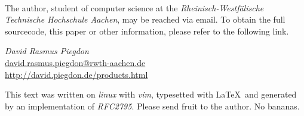 \documentclass[twoside,a4paper,graphics,11pt,dvips]{article}
\begin{document}
\begin{small}

%
\ 


The author, student of computer science at the \emph{Rheinisch-Westf\"alische
Technische Hochschule Aachen}, may be reached via email. To obtain the full
sourcecode, this paper or other information, please refer to the following link.

\begin{center}

	\textit{David Rasmus Piegdon} \\
	\href{mailto:david.rasmus.piegdon@rwth-aachen.de}{david.rasmus.piegdon@rwth-aachen.de} \\
	\href{http://david.piegdon.de/products.html}{http://david.piegdon.de/products.html} \\

\end{center}


This text was written on \emph{linux} with \emph{vim}, typesetted with \LaTeX\ and generated by an
implementation of \emph{RFC2795}. Please send fruit to the author. No bananas.

\end{small}



\pagestyle{headings}

\tableofcontents


%













\newpage
\begingroup

\endgroup

\end{document}
